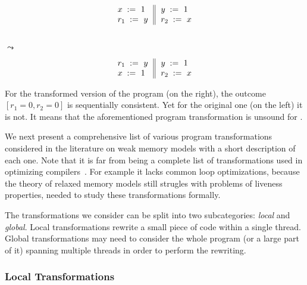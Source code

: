 \begin{minipage}{0.45\linewidth}
\begin{equation*}
\inarrII{
   \writeInst{}{x}{1}   \\
   \readInst{}{r_1}{y}  \\
}{
  \writeInst{}{y}{1}   \\
  \readInst{}{r_2}{x}  \\
}
\end{equation*}
\end{minipage}\hfill%
\begin{minipage}{0.05\linewidth}
\Large~\\ $\leadsto$
\end{minipage}\hfill%
\begin{minipage}{0.45\linewidth}
\begin{equation*}
\inarrII{
   \readInst{}{r_1}{y}  \\
   \writeInst{}{x}{1}   \\
}{
  \writeInst{}{y}{1}   \\
  \readInst{}{r_2}{x}  \\
}
\end{equation*}
\end{minipage}

For the transformed version of the program (on the right),
the outcome $[r_1=0, r_2=0]$ is sequentially consistent.
Yet for the original one (on the left) it is not. 
It means that the aforementioned program transformation
is unsound for \SC. 

We next present a comprehensive list of 
various program transformations considered in
the literature on weak memory models 
with a short description of each one.
Note that it is far from being a complete list of 
transformations used in optimizing compilers~\cite{Muchnick:ACDI97}.
For example it lacks common loop optimizations, 
because the theory of relaxed memory models still
strugles with problems of liveness properties, 
needed to study these transformations formally. 

The transformations we consider can be split into 
two subcategories: \emph{local} and \emph{global}.
Local transformations rewrite a small 
piece of code within a single thread.
Global transformations may need to consider 
the whole program (or a large part of it) 
spanning multiple threads in order 
to perform the rewriting.       
 
\subsubsection{Local Transformations}

